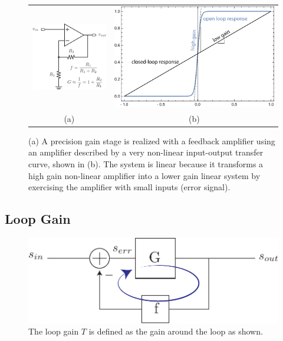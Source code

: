 \begin{figure}[tb]
\begin{center}
\begin{tabular}{cc}
\includegraphics[width=.25\columnwidth]{opamp_fb_precise} &
\includegraphics[width=.75\columnwidth]{opamp_gain} \\
(a) & (b) 
\end{tabular}
\end{center}
\caption{(a)  A precision gain stage is realized with a feedback amplifier using an amplifier described by a very non-linear input-output transfer curve, shown in (b).  The system is linear because it transforms a high gain non-linear amplifier into a lower gain linear system by exercising the amplifier with small inputs (error signal).} \label{fig:opamp_fb_precise}
\end{figure}




\subsection{Loop Gain}

\begin{figure}[tb]
\begin{center}
\includegraphics[scale=.7]{fbblock_loopgain}
\end{center}
\caption{The loop gain $T$ is defined as the gain around the loop as shown.} \label{fig:fbblock_loopgain}
\end{figure}

